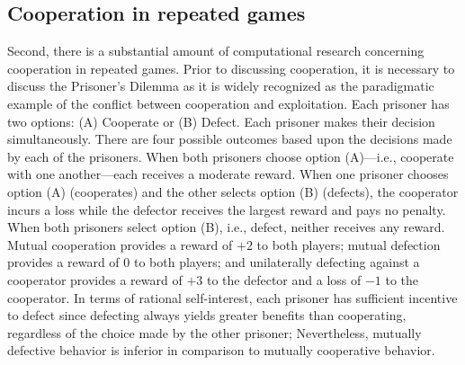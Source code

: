 \documentclass[10pt,twocolumn,letterpaper]{article}
\begin{document}
\subsection{Cooperation in repeated games}
Second, there is a substantial amount of computational research
concerning cooperation in repeated games. Prior to discussing
cooperation, it is necessary to discuss the Prisoner's Dilemma as it
is widely recognized as the paradigmatic example of the conflict
between cooperation and exploitation. Each prisoner has two options:
(A) Cooperate or (B) Defect. Each prisoner makes their decision
simultaneously. There are four possible outcomes based upon the
decisions made by each of the prisoners. When both prisoners choose
option (A)---i.e., cooperate with one another---each receives a
moderate reward. When one prisoner chooses option (A) (cooperates)
and the other selects option (B) (defects), the cooperator incurs a
loss while the defector receives the largest reward and pays no
penalty. When both prisoners select option (B), i.e., defect,
neither receives any reward. Mutual cooperation provides
a reward of $+2$ to both players; mutual defection provides a reward
of $0$ to both players; and unilaterally defecting against a
cooperator provides a reward of $+3$ to the defector and a loss of
$-1$ to the cooperator. In terms of rational self-interest, each prisoner has
sufficient incentive to defect since defecting always yields greater
benefits than cooperating, regardless of the choice made by the
other prisoner; Nevertheless, mutually defective behavior is
inferior in comparison to mutually cooperative behavior.
\end{document}
